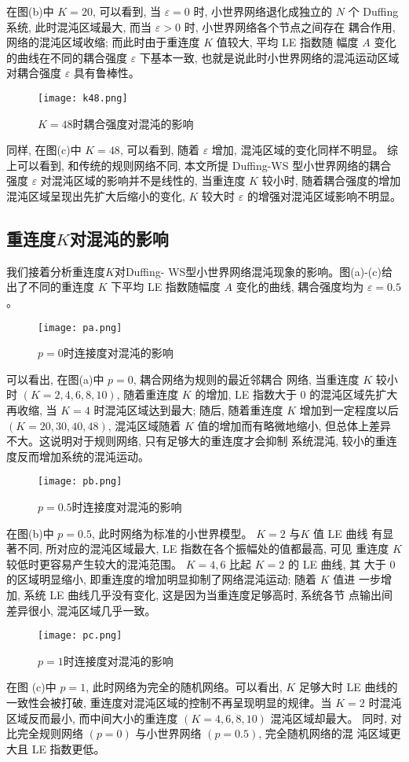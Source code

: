 在图(b)中 $K=20$, 可以看到, 当 $\varepsilon=0$ 时, 小世界网络退化成独立的 $N$ 个 Duffing系统, 此时混沌区域最大,
而当 $\varepsilon>0$ 时, 小世界网络各个节点之间存在 耦合作用, 网络的混沌区域收缩; 而此时由于重连度 $K$ 值较大, 平均 LE 指数随
幅度 $A$ 变化的曲线在不同的耦合强度 $\varepsilon$ 下基本一致, 也就是说此时小世界网络的混沌运动区域对耦合强度
$\varepsilon$ 具有鲁棒性。\par
\begin{figure}[!htbp]
    \centering
    \texttt{[image: k48.png]}
    \caption{$K=48$时耦合强度对混沌的影响}
\end{figure}
同样, 在图(c)中 $K=48$, 可以看到, 随着 $\varepsilon$ 增加, 混沌区域的变化同样不明显。
综上可以看到, 和传统的规则网络不同, 本文所提 Duffing-WS 型小世界网络的耦合强度 $\varepsilon$
对混沌区域的影响并不是线性的, 当重连度 $K$ 较小时, 随着耦合强度的增加混沌区域呈现出先扩大后缩小的变化,
$K$ 较大时 $\varepsilon$ 的增强对混沌区域影响不明显。


\subsection*{重连度$K$对混沌的影响}
我们接着分析重连度$K$对Duffing- WS型小世界网络混沌现象的影响。图(a)-(c)给出了不同的重连度 $K$ 下平均 LE 指数随幅度 $A$ 变化的曲线, 耦合强度均为 $\varepsilon=0.5$ 。\par
\begin{figure}[!htbp]
    \centering
    \texttt{[image: pa.png]}
    \caption{$p=0$时连接度对混沌的影响}
\end{figure}
可以看出, 在图(a)中 $p=0$, 耦合网络为规则的最近邻耦合 网络, 当重连度 $K$ 较小时 $(K=2,4,6,8,10)$,
随着重连度 $K$ 的增加, LE 指数大于 0 的混沌区域先扩大再收缩, 当 $K=4$ 时混沌区域达到最大; 随后,
随着重连度 $K$ 增加到一定程度以后 $(K=20,30,40,48)$, 混沌区域随着 $K$ 值的增加而有略微地缩小,
但总体上差异不大。这说明对于规则网络, 只有足够大的重连度才会抑制 系统混沌, 较小的重连度反而增加系统的混沌运动。\par
\begin{figure}[!htbp]
    \centering
    \texttt{[image: pb.png]}
    \caption{$p=0.5$时连接度对混沌的影响}
\end{figure}
在图(b)中 $p=0.5$, 此时网络为标准的小世界模型。 $K=2$ 与$K$ 值 LE 曲线 有显著不同, 所对应的混沌区域最大,
LE 指数在各个振幅处的值都最高, 可见 重连度 $K$ 较低时更容易产生较大的混沌范围。 $K=4,6$ 比起 $K=2$ 的 LE 曲线, 其
大于 0 的区域明显缩小, 即重连度的增加明显抑制了网络混沌运动; 随着 $K$ 值进 一步增加, 系统 LE 曲线几乎没有变化,
这是因为当重连度足够高时, 系统各节 点输出间差异很小, 混沌区域几乎一致。\par
\begin{figure}[!htbp]
    \centering
    \texttt{[image: pc.png]}
    \caption{$p=1$时连接度对混沌的影响}
\end{figure}
在图 (c)中 $p=1$, 此时网络为完全的随机网络。可以看出, $K$ 足够大时 LE 曲线的一致性会被打破,
重连度对混沌区域的控制不再呈现明显的规律。当 $K=2$ 时混沌区域反而最小, 而中间大小的重连度 $(K=4,6,8,10)$ 混沌区域却最大。
同时, 对比完全规则网络 $(p=0)$ 与小世界网络 $(p=0.5)$, 完全随机网络的混 沌区域更大且 LE 指数更低。
